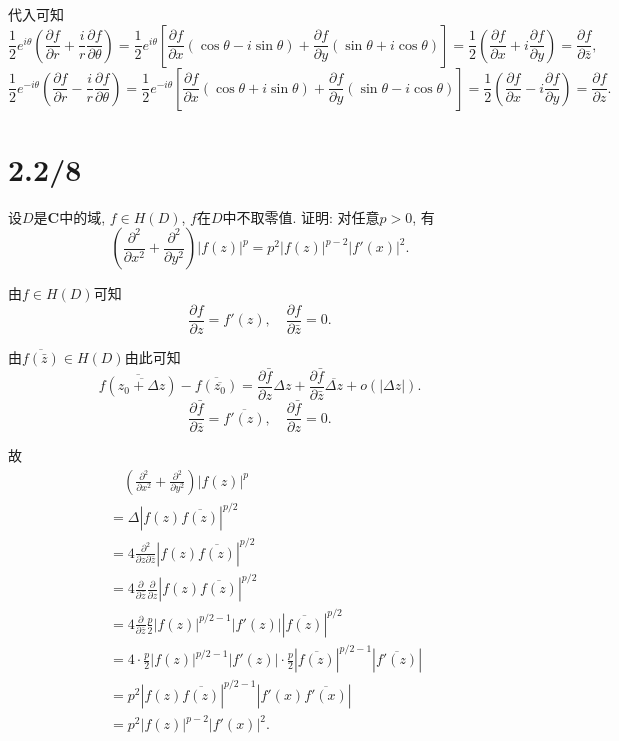 \documentclass[11pt,a4paper]{article}
\begin{document}
代入可知
$$\frac{1}{2}e^{i\theta}\left(\frac{\partial f}{\partial r}+\frac{i}{r}\frac{\partial f}{\partial\theta}\right)=
  \frac{1}{2}e^{i\theta}\left[\frac{\partial f}{\partial x}(\cos\theta-i\sin\theta)+\frac{\partial f}{\partial y}(\sin\theta+i\cos\theta)\right]=
  \frac{1}{2}\left(\frac{\partial f}{\partial x}+i\frac{\partial f}{\partial y}\right)=\frac{\partial f}{\partial\bar{z}},$$
$$\frac{1}{2}e^{-i\theta}\left(\frac{\partial f}{\partial r}-\frac{i}{r}\frac{\partial f}{\partial\theta}\right)=
  \frac{1}{2}e^{-i\theta}\left[\frac{\partial f}{\partial x}(\cos\theta+i\sin\theta)+\frac{\partial f}{\partial y}(\sin\theta-i\cos\theta)\right]=
  \frac{1}{2}\left(\frac{\partial f}{\partial x}-i\frac{\partial f}{\partial y}\right)=\frac{\partial f}{\partial z}.$$



\section{2.2/8}
\begin{problem}
  设$D$是$\mathbf{C}$中的域, $f\in H(D)$, $f$在$D$中不取零值. 证明: 对任意$p>0$, 有
  $$\left(\frac{\partial^2}{\partial x^2}+\frac{\partial^2}{\partial y^2}\right)|f(z)|^p= p^2|f(z)|^{p-2}|f'(x)|^2.$$
\end{problem}

由$f\in H(D)$可知
$$\frac{\partial f}{\partial z}=f'(z),\quad \frac{\partial f}{\partial\bar{z}}=0.$$

由$\overline{f(\bar{z})}\in H(D)$由此可知
$$\overline{f(\overline{z_0+\Delta z})}-\overline{f(\overline{z_0})}=\frac{\partial\bar{f}}{\partial z}\Delta z+ \frac{\partial\bar{f}}{\partial\bar{z}}\overline{\Delta z}+o(|\Delta z|).$$
$$\frac{\partial\bar{f}}{\partial\bar{z}}=\overline{f'(z)},\quad\frac{\partial\bar{f}}{\partial z}=0.$$

故
\begin{align*}
   & \quad \left(\frac{\partial^2}{\partial x^2}+\frac{\partial^2}{\partial y^2}\right)|f(z)|^p          \\
   & = \Delta|f(z)\overline{f(z)}|^{p/2}                                                                 \\
   & =4\frac{\partial^2}{\partial z\partial\bar{z}}|f(z)\overline{f(z)}|^{p/2}                           \\
   & =4\frac{\partial}{\partial\bar{z}}\frac{\partial}{\partial z}|f(z)\overline{f(z)}|^{p/2}            \\
   & = 4\frac{\partial}{\partial\bar{z}}\frac{p}{2}|f(z)|^{p/2-1}|f'(z)||\overline{f(z)}|^{p/2}          \\
   & = 4\cdot\frac{p}{2}|f(z)|^{p/2-1}|f'(z)|\cdot\frac{p}{2}|\overline{f(z)}|^{p/2-1}|\overline{f'(z)}| \\
   & =p^2|f(z)\overline{f(z)}|^{p/2-1}|f'(x)\overline{f'(x)}|                                            \\
   & = p^2|f(z)|^{p-2}|f'(x)|^2.
\end{align*}
\end{document}
